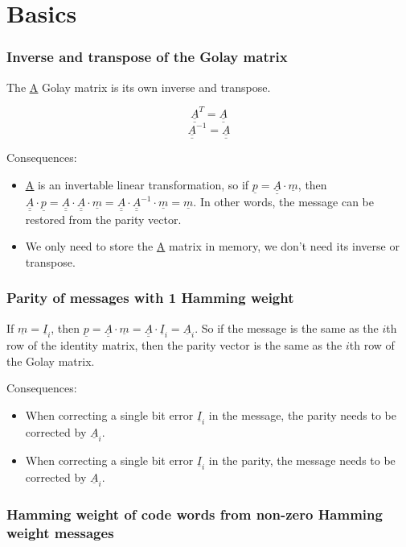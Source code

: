 \documentclass[11pt,a4paper,oneside]{report}             %
\def\doubleunderline#1{\underline{\underline{#1}}}
\def\dul#1{\doubleunderline{#1}}
\def\ul#1{\underline{#1}}
\begin{document}
\section{Basics}

\subsubsection{Inverse and transpose of the Golay matrix}

The \dul{A} Golay matrix is its own inverse and transpose.

\[
    \dul{A}^T = \dul{A}
\]
\[
    \dul{A}^{-1} = \dul{A}
\]

Consequences:
\begin{itemize}
    \item \dul{A} is an invertable linear transformation, so if $\ul{p} = \dul{A} \cdot \ul{m}$, then
          $\dul{A} \cdot \ul{p} = \dul{A} \cdot \dul{A} \cdot \ul{m} = \dul{A} \cdot \dul{A}^{-1} \cdot \ul{m} = \ul{m}$.
          In other words, the message can be restored from the parity vector.
    \item We only need to store the \ul{A} matrix in memory, we don't need its inverse or transpose.
\end{itemize}

\subsubsection{Parity of messages with 1 Hamming weight}

If $\ul{m} = \ul{I}_{i}$, then $\ul{p} = \dul{A} \cdot \ul{m} = \dul{A} \cdot \ul{I}_{i} = \ul{A}_{i}$.
So if the message is the same as the $i$th row of the identity matrix, then the parity vector is the
same as the $i$th row of the Golay matrix.

Consequences:
\begin{itemize}
    \item When correcting a single bit error $\ul{I}_{i}$ in the message, the parity needs to be corrected by $\ul{A}_{i}$.
    \item When correcting a single bit error $\ul{I}_{i}$ in the parity, the message needs to be corrected by $\ul{A}_{i}$.
\end{itemize}

\subsubsection{Hamming weight of code words from non-zero Hamming weight messages}
\end{document}
